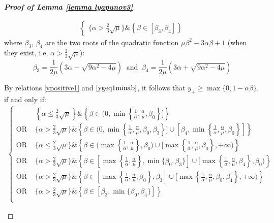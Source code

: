 \documentclass[reqno]{amsart}
\theoremstyle{plain}
\theoremstyle{definition}
\theoremstyle{remark}
\begin{document}
\begin{proof}[\textbf{Proof of Lemma \ref{lemma lyapunov3}}]
\begin{itemize}[wide=0pt]
\begin{itemize}[wide=5pt]
\begin{equation}
\begin{aligned}
\begin{cases}
						\{\alpha > \frac{2}{3}\sqrt{\mu}\}\&\left\{\beta\in [\beta_{3},\beta_{4}]\right\} 
					\end{cases}
				\end{aligned}
			\end{equation}
			where $\beta_{3}$, $\beta_{4}$ are the two roots of the quadratic function $\mu\beta^{2}-3\alpha\beta+1$ (when they exist, i.e. $\alpha>\frac{2}{3}\sqrt{\mu}$):
			\begin{equation}
				\beta_{3}=\frac{1}{2\mu}\left(3\alpha-\sqrt{9\alpha^{2}-4\mu}\right) ~ \text{ and } ~ \beta_{4}=\frac{1}{2\mu}\left(3\alpha+\sqrt{9\alpha^{2}-4\mu}\right)
			\end{equation}	
			
			By relations \eqref{ypositive1} and $\eqref{ygeq1minab}$, it follows that $y_{+}\geq \max\{0,1-\alpha\beta\}$, if and only if:
			\begin{equation}\label{ygeq1minab2}
				\begin{aligned}
					\begin{cases}
						& \left\{\alpha\leq \frac{2}{3}\sqrt{\mu}\right\}\&\left\{\beta \in (0, \min\left\{\frac{1}{\alpha}, \frac{\alpha}{\mu},\beta_{0}\right\}\big]\right\} \\
						\text{OR } &
						\{\alpha > \frac{2}{3}\sqrt{\mu}\} \& \left\{\beta\in (0,\min\left\{\frac{1}{\alpha}, \frac{\alpha}{\mu},\beta_{0},\beta_{3}\right\}\big]\cup\left[\beta_{4},\min\left\{\frac{1}{\alpha}, \frac{\alpha}{\mu},\beta_{0}\right\}\right]\right\}   \\
						\text{OR } &
						\{\alpha \leq \frac{2}{3}\sqrt{\mu}\}\&\left\{\beta \in  \big(\max\left\{\frac{1}{\alpha},\frac{\alpha}{\mu}\right\},\beta_{0})\cup \big[\max\left\{\frac{1}{\alpha},\frac{\alpha}{\mu},\beta_{0}\right\},+\infty) \right\}   \\
						\text{OR } &
						\{\alpha > \frac{2}{3}\sqrt{\mu}\} \& \left\{\beta\in \left[\max\left\{\frac{1}{\alpha}, \frac{\alpha}{\mu}\right\},\min\{\beta_{0},\beta_{3}\}\right]\cup[\max\left\{\frac{1}{\alpha}, \frac{\alpha}{\mu},\beta_{4}\right\},\beta_{0})\right\}   \\
						\text{OR } &
						\{\alpha > \frac{2}{3}\sqrt{\mu}\} \& \left\{\beta\in \left[\max\left\{\frac{1}{\alpha}, \frac{\alpha}{\mu},\beta_{0}\right\},\beta_{3}\right]\cup[\max\left\{\frac{1}{\alpha}, \frac{\alpha}{\mu},\beta_{0},\beta_{4}\right\},+\infty)\right\}   \\
						\text{OR } &
						\{\alpha > \frac{2}{3}\sqrt{\mu}\}\&\left\{\beta\in [\beta_{3},\min\{\beta_{0},\beta_{4}\}]\right\}   \\

\end{cases}
\end{aligned}
\end{equation}
\end{itemize}
\end{itemize}
\end{proof}
\end{document}
